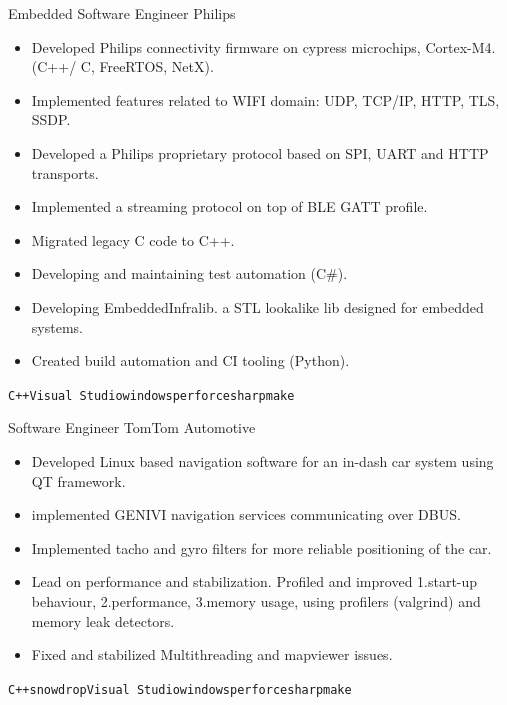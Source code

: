 \documentclass[9pt]{developercv} %
\begin{document}
\begin{entrylist}
	\entry
		{}
        {Embedded Software Engineer}
        {Philips}
          {\begin{itemize}
           \setlength\itemsep{-0.5em}
           \item {Developed Philips connectivity firmware on cypress microchips, Cortex-M4.(C++/ C, FreeRTOS, NetX).}
            \item {Implemented features related to WIFI domain: UDP, TCP/IP, HTTP, TLS, SSDP.}
            \item {Developed a Philips proprietary protocol based on SPI, UART and HTTP transports.}
            \item {Implemented a streaming protocol on top of BLE GATT profile.}
            \item {Migrated legacy C code to C++.}
            \item {Developing and maintaining test automation (C\#).}
            \item {Developing EmbeddedInfralib. a STL lookalike lib designed for embedded systems.}
            \item {Created build automation and CI tooling (Python).}
          \end{itemize}
            \texttt{C++}\slashsep\texttt{}\slashsep\texttt{Visual Studio}\slashsep\texttt{windows}\slashsep\texttt{perforce}\slashsep\texttt{sharpmake}
            }
	\entry
		{}
        {Software Engineer}
        {TomTom Automotive}
          {\begin{itemize}
           \setlength\itemsep{-0.5em}
            \item {Developed Linux based navigation software for an in-dash car system using QT framework.}
            \item {implemented GENIVI navigation services communicating over DBUS.}
            \item {Implemented tacho and gyro filters for more reliable positioning of the car. }
            \item {Lead on performance and stabilization. Profiled and improved 1.start-up behaviour, 2.performance, 3.memory usage, using profilers (valgrind) and memory leak detectors.}
            \item {Fixed and stabilized Multithreading and mapviewer issues.}
          \end{itemize}
            \texttt{C++}\slashsep\texttt{snowdrop}\slashsep\texttt{Visual Studio}\slashsep\texttt{windows}\slashsep\texttt{perforce}\slashsep\texttt{sharpmake}}
\end{entrylist}
\end{document}
